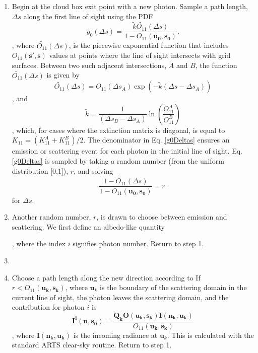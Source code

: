 \begin{enumerate}
\item
Begin at the cloud box exit point with a new photon. Sample a
  path length, $\Delta s$ along the first line of sight using the PDF
\begin{equation}
g_0(\Delta s)=\frac{\tilde{k}\tilde{O_{11}}(\Delta s)}
{1-O_{11}(\mathbf{u_0,s_0})}.
\label{g0Deltas}
\end{equation}
, where $\tilde{O_{11}}(\Delta s)$, is the piecewise exponential
function that includes $O_{11}(\mathbf{s',s})$ values at points
where the line of sight intersects with grid surfaces.
Between two such adjacent intersections, $A$ and $B$, the function
$\tilde{O_{11}}(\Delta s)$ is given by
\begin{equation}
\tilde{O_{11}}(\Delta s)=O_{11}(\Delta s_A)\exp\left(-\tilde{k}\left(\Delta s-\Delta
s_A\right)\right)
\label{O11}
\end{equation}
, and
\begin{equation}
\tilde{k}=\frac{1}{\left(\Delta s_B-\Delta s_A\right)}
\ln\left(\frac{O_{11}^A}{O_{11}^B}\right)
\end{equation}
, which, for cases where the extinction matrix is diagonal, is equal to $K_{11}=(K_{11}^A+K_{11}^B)/2$.
The denominator in Eq. \ref{g0Deltas} ensures an emission or scattering
event for each photon in the initial line of sight.
Eq. \ref{g0Deltas} is sampled by taking a random number (from the
uniform distribution [0,1]), $r$, and solving 
\begin{equation}
\frac{1-\tilde{O_{11}}(\Delta s)}{1-O_{11}(\mathbf{u_0,s_0})}=r.
\end{equation}
for $\Delta s$.
\item
Another random number, $r$, is drawn to choose between emission and scattering.  We first define an albedo-like quantity

, where the index $i$ signifies photon number. Return to step 1.

\item

\item
Choose a path length along the new direction according to
If $r<O_{11}(\mathbf{u_{k},s_k})$, where $\mathbf{u}_{k}$ is the
  boundary of the scattering domain in the current line of sight, the
  photon leaves the scattering domain, and the contribution for photon $i$ is
\begin{equation}
\mathbf{I^i(n,s_0)}=\frac{\mathbf{Q_k}\mathbf{O(u_k,s_k)I(n_k,u_k)}}{O_{11}(\mathbf{u_{k},s_k})}
\label{Ikmax2_1}
\end{equation}
, where 
$\mathbf{I(n_k,u_k)}$ is the incoming radiance at $\mathbf{u}_{k}$.  This is calculated with the standard ARTS clear-sky
routine. Return to step 1.


\end{enumerate}
